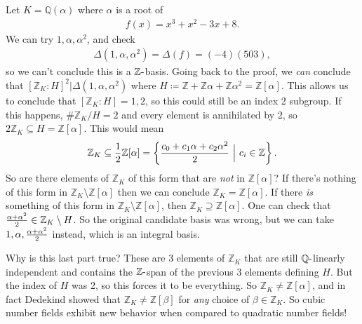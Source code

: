 \begin{example}[?]

Let \(K = {\mathbb{Q}}( \alpha)\) where \(\alpha\) is a root of
\begin{align*}
f(x) = x^3 + x^2 - 3x + 8
.\end{align*}
We can try \(1, \alpha, \alpha^2\), and check
\begin{align*}
{\Delta}(1, \alpha, \alpha^2) = {\Delta}(f) = (-4)(503)
,\end{align*}
so we can't conclude this is a \({\mathbb{Z}}{\hbox{-}}\)basis. Going
back to the proof, we \emph{can} conclude that
\([{\mathbb{Z}}_K: H] ^2 \mathrel{\Big|}{\Delta}(1, \alpha, \alpha^2)\)
where
\(H \coloneqq{\mathbb{Z}}+ {\mathbb{Z}}\alpha + {\mathbb{Z}}\alpha^2 = {\mathbb{Z}}[ \alpha ]\).
This allows us to conclude that \([{\mathbb{Z}}_K: H] = 1, 2\), so this
could still be an index 2 subgroup. If this happens,
\(\# {\mathbb{Z}}_K/H = 2\) and every element is annihilated by 2, so
\(2{\mathbb{Z}}_K \subseteq H = {\mathbb{Z}}[ \alpha ]\). This would
mean
\begin{align*}
{\mathbb{Z}}_K \subseteq {1\over 2} {\mathbb{Z}}[ \alpha ] 
= 
\left\{{ {c_0 + c_1 \alpha + c_2 \alpha^2 \over 2} {~\mathrel{\Big|}~}c_i \in {\mathbb{Z}}}\right\} 
.\end{align*}
So are there elements of \({\mathbb{Z}}_K\) of this form that are
\emph{not} in \({\mathbb{Z}}[ \alpha ]\)? If there's nothing of this
form in \({\mathbb{Z}}_K \setminus{\mathbb{Z}}[ \alpha ]\) then we can
conclude \({\mathbb{Z}}_K = {\mathbb{Z}}[ \alpha ]\). If there \emph{is}
something of this form in
\({\mathbb{Z}}_K \setminus{\mathbb{Z}}[ \alpha ]\), then
\({\mathbb{Z}}_K \supseteq {\mathbb{Z}}[\alpha]\). One can check that
\({\alpha+ \alpha^2 \over 2} \in {\mathbb{Z}}_K \setminus H\). So the
original candidate basis was wrong, but we can take
\(1, \alpha, {\alpha + \alpha^2 \over 2}\) instead, which is an integral
basis.

\end{example}

\begin{remark}

Why is this last part true? These are 3 elements of \({\mathbb{Z}}_K\)
that are still \({\mathbb{Q}}{\hbox{-}}\)linearly independent and
contains the \({\mathbb{Z}}{\hbox{-}}\)span of the previous 3 elements
defining \(H\). But the index of \(H\) was 2, so this forces it to be
everything. So \({\mathbb{Z}}_K \neq {\mathbb{Z}}[ \alpha]\), and in
fact Dedekind showed that \({\mathbb{Z}}_K \neq {\mathbb{Z}}[ \beta]\)
for \emph{any} choice of \(\beta\in {\mathbb{Z}}_K\). So cubic number
fields exhibit new behavior when compared to quadratic number fields!

\end{remark}

